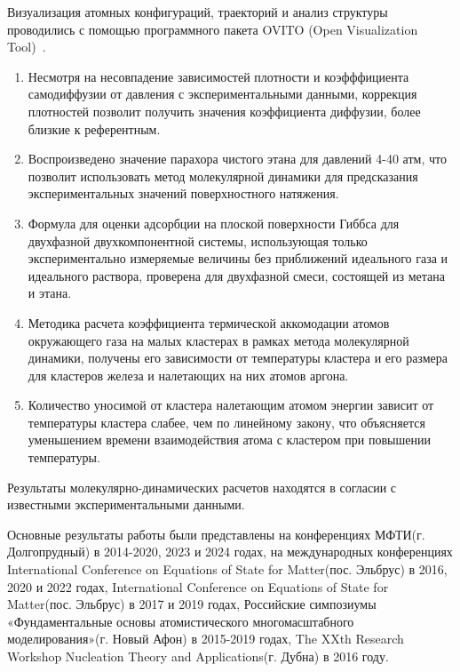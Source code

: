 Визуализация атомных конфигураций, траекторий и анализ структуры проводились с помощью программного пакета OVITO (Open Visualization Tool)~\cite{ovito}.

{}
\begin{enumerate}[beginpenalty=10000] %

  \item Несмотря на несовпадение зависимостей плотности и коэфффициента самодиффузии от давления с экспериментальными данными, коррекция плотностей позволит получить значения коэффициента диффузии, более близкие к референтным.
  \item Воспроизведено значение парахора чистого этана для давлений 4-40 атм, что позволит использовать метод молекулярной динамики для предсказания экспериментальных значений поверхностного натяжения.
  \item Формула для оценки адсорбции на плоской поверхности Гиббса для двухфазной двухкомпонентной системы, использующая только экспериментально измеряемые величины без приближений идеального газа и идеального раствора, проверена для двухфазной смеси, состоящей из метана и этана.
  \item Методика расчета коэффициента термической аккомодации атомов окружающего газа на малых кластерах в рамках метода молекулярной динамики, получены его зависимости от температуры кластера и его размера для кластеров железа и налетающих на них атомов аргона.
  \item Количество уносимой от кластера налетающим атомом энергии зависит от температуры кластера слабее, чем по линейному закону, что объясняется уменьшением времени взаимодействия атома с кластером при повышении температуры.
  
\end{enumerate}

{\reliability} Результаты молекулярно-динамических расчетов находятся в согласии с известными экспериментальными данными.

{\probation}
Основные результаты работы были представлены на конференциях МФТИ(г. Долгопрудный) в 2014-2020, 2023 и 2024 годах, на международных конференциях International Conference on Equations of State for Matter(пос. Эльбрус) в 2016, 2020 и 2022 годах, International Conference on Equations of State for Matter(пос. Эльбрус) в 2017 и 2019 годах, Российские симпозиумы «Фундаментальные основы атомистического многомасштабного моделирования»(г. Новый Афон) в 2015-2019 годах, The XXth Research Workshop Nucleation Theory and Applications(г. Дубна) в 2016 году.

